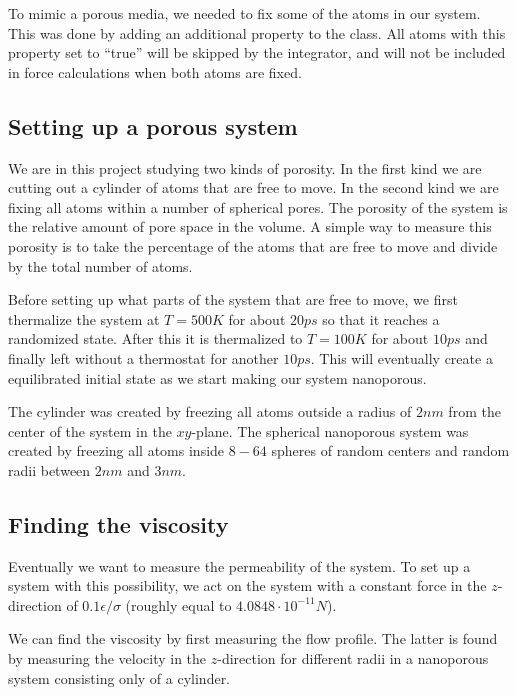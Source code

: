 \documentclass[reprint,floatfix,amsmath,amssymb,aps,pra]{revtex4-1}
\begin{document}
To mimic a porous media, we needed to fix some of the atoms in our system. This was done by adding an additional  property to the  class. All atoms with this property set to ``true'' will be skipped by the integrator, and will not be included in force calculations when both atoms are fixed.

\subsection{Setting up a porous system}

We are in this project studying two kinds of porosity. In the first kind we are cutting out a cylinder of atoms that are free to move. In the second kind we are fixing all atoms within a number of spherical pores. The porosity of the system is the relative amount of pore space in the volume. A simple way to measure this porosity is to take the percentage of the atoms that are free to move and divide by the total number of atoms.

Before setting up what parts of the system that are free to move, we first thermalize the system at $T = 500 \unit{K}$ for about $20 \unit{ps}$ so that it reaches a randomized state. After this it is thermalized to $T = 100 \unit{K}$ for about $10 \unit{ps}$ and finally left without a thermostat for another $10 \unit{ps}$. This will eventually create a equilibrated initial state as we start making our system nanoporous.

The cylinder was created by freezing all atoms outside a radius of $2 \unit{nm}$ from the center of the system in the $xy$-plane. The spherical nanoporous system was created by freezing all atoms inside $8-64$ spheres of random centers and random radii between $2 \unit{nm}$ and $3 \unit{nm}$.

\subsection{Finding the viscosity}

Eventually we want to measure the permeability of the system. To set up a system with this possibility, we act on the system with a constant force in the $z$-direction of $0.1 \epsilon / \sigma$ (roughly equal to $4.0848 \cdot 10^{-11} \unit{N}$).

We can find the viscosity by first measuring the flow profile. The latter is found by measuring the velocity in the $z$-direction for different radii in a nanoporous system consisting only of a cylinder. 
\end{document}
